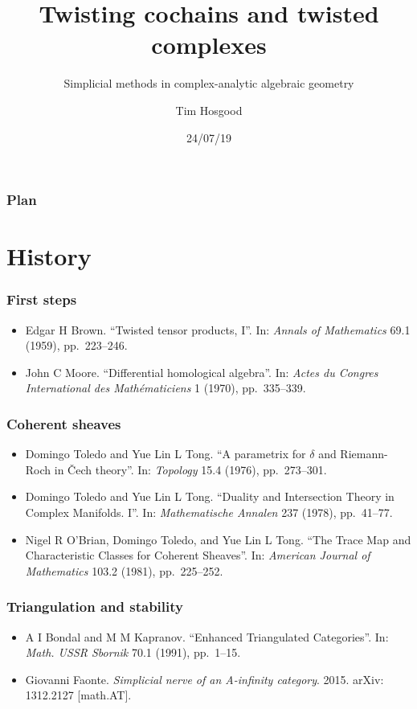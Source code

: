 \documentclass{beamer}
\title{Twisting cochains and twisted complexes}
\subtitle{Simplicial methods in complex-analytic algebraic geometry}
\author{Tim Hosgood}
\institute{Université d'Aix-Marseille}
\date{24/07/19}
\begin{document}
    \begin{frame}
        \titlepage
    \end{frame}

    \begin{frame}
        \frametitle{Plan}
        \tableofcontents
    \end{frame}


    \section{History}

        \begin{frame}\frametitle{First steps}
            \begin{itemize}
                \item Edgar H Brown. ``Twisted tensor products, I''. In: \emph{Annals of Mathematics} 69.1 (1959), pp.~223--246.
                \item John C Moore. ``Differential homological algebra''. In: \emph{Actes du Congres International des Mathématiciens} 1 (1970), pp.~335--339.
            \end{itemize}
        \end{frame}

        \begin{frame}\frametitle{Coherent sheaves}
            \begin{itemize}
                \item Domingo Toledo and Yue Lin L Tong. ``A parametrix for $\delta$ and Riemann-Roch in Čech theory''. In: \emph{Topology} 15.4 (1976), pp.~273--301.
                \item Domingo Toledo and Yue Lin L Tong. ``Duality and Intersection Theory in Complex Manifolds. I''. In: \emph{Mathematische Annalen} 237 (1978), pp.~41--77.
                \item Nigel R O'Brian, Domingo Toledo, and Yue Lin L Tong. ``The Trace Map and Characteristic Classes for Coherent Sheaves''. In: \emph{American Journal of Mathematics} 103.2 (1981), pp.~225--252.
            \end{itemize}
        \end{frame}

        \begin{frame}\frametitle{Triangulation and stability}
            \begin{itemize}
                \item A I Bondal and M M Kapranov. ``Enhanced Triangulated Categories''. In: \emph{Math. USSR Sbornik} 70.1 (1991), pp.~1--15.
                \item Giovanni Faonte. \emph{Simplicial nerve of an A-infinity category}. 2015. arXiv: 1312.2127 [math.AT].
            \end{itemize}
        \end{frame}
\end{document}

